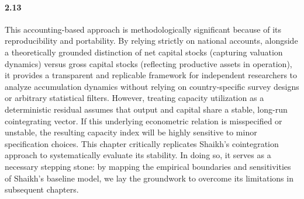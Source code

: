 \paragraph{2.13}
This accounting-based approach is methodologically significant because of its reproducibility and portability. By relying strictly on national accounts, alongside a theoretically grounded distinction of net capital stocks (capturing valuation dynamics) versus gross capital stocks (reflecting productive assets in operation), it provides a transparent and replicable framework for independent researchers to analyze accumulation dynamics without relying on country-specific survey designs or arbitrary statistical filters. However, treating capacity utilization as a deterministic residual assumes that output and capital share a stable, long-run cointegrating vector. If this underlying econometric relation is misspecified or unstable, the resulting capacity index will be highly sensitive to minor specification choices. This chapter critically replicates Shaikh's cointegration approach to systematically evaluate its stability. In doing so, it serves as a necessary stepping stone: by mapping the empirical boundaries and sensitivities of Shaikh's baseline model, we lay the groundwork to overcome its limitations in subsequent chapters.
